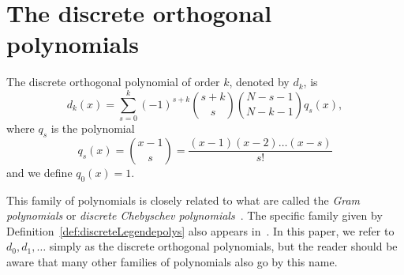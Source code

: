 \documentclass[5p]{elsarticle}
\begin{document}

\section{The discrete orthogonal polynomials}\label{sec:discr-orth-polyn}

\begin{definition}  \label{def:discreteLegendepolys}
The discrete orthogonal polynomial of order $k$, denoted by $d_k$, is
\[
d_k(x) = \sum_{s=0}^k{(-1)^{s+k}\binom{s+k}{s}\binom{N-s-1}{N-k-1}q_s(x)},
\]
where $q_s$ is the polynomial
\[
q_s(x) = \binom{x-1}{s} = \frac{(x-1)(x-2)\dots(x-s)}{s!}
\]
and we define $q_0(x) = 1$.
\end{definition}
This family of polynomials is closely related to what are called the \emph{Gram polynomials} or \emph{discrete Chebyschev polynomials}~\cite[p. 323]{Bjork_num_methods_least_square_1996}\cite{Chebyshev_discrete_polys1864,Gram_discrete_polys1883}.  The specific family given by Definition~\ref{def:discreteLegendepolys} also appears in~\cite{Eisinberg2007_discerete_otho_poly_equidist}.  In this paper, we refer to $d_0,d_1,\dots$ simply as the discrete orthogonal polynomials, but the reader should be aware that many other families of polynomials also go by this name.  
\end{document}
